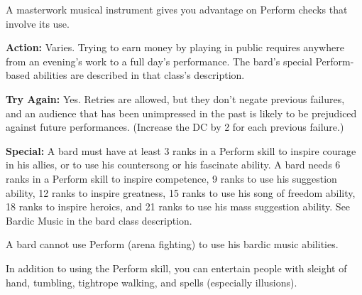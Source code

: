 A masterwork musical instrument gives you advantage on Perform checks that involve its use.

\textbf{Action:} Varies. Trying to earn money by playing in public requires anywhere from an evening's work to a full day's performance. The bard's special Perform-based abilities are described in that class's description.

\textbf{Try Again:} Yes. Retries are allowed, but they don't negate previous failures, and an audience that has been unimpressed in the past is likely to be prejudiced against future performances. (Increase the DC by 2 for each previous failure.)

\textbf{Special:} A bard must have at least 3 ranks in a Perform skill to inspire courage in his allies, or to use his countersong or his fascinate ability. A bard needs 6 ranks in a Perform skill to inspire competence, 9 ranks to use his suggestion ability, 12 ranks to inspire greatness, 15 ranks to use his song of freedom ability, 18 ranks to inspire heroics, and 21 ranks to use his mass suggestion ability. See Bardic Music in the bard class description.

A bard cannot use Perform (arena fighting) to use his bardic music abilities.

In addition to using the Perform skill, you can entertain people with sleight of hand, tumbling, tightrope walking, and spells (especially illusions).


